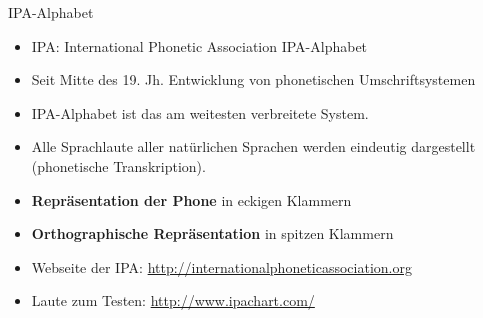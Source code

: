 \begin{frame}{IPA-Alphabet}

	\begin{itemize}
		\item IPA: International Phonetic Association \ras IPA-Alphabet
		\item Seit Mitte des 19. Jh. \ras Entwicklung von phonetischen Umschriftsystemen
		\item IPA-Alphabet ist das am weitesten verbreitete System.
		\item Alle Sprachlaute aller natürlichen Sprachen werden eindeutig dargestellt (phonetische Transkription).
\medskip
		\item \textbf{Repräsentation der Phone} \ras in eckigen Klammern \gqq{\textipa{[ ]}}
		\item \textbf{Orthographische Repräsentation} \ras in spitzen Klammern \gqq{$\langle{} \rangle{}$}
\medskip
		\item {Webseite der IPA}: \url{http://internationalphoneticassociation.org}
		\item {Laute zum Testen}: \url{http://www.ipachart.com/}
	\end{itemize}
	
\end{frame}


%
%		
%	


